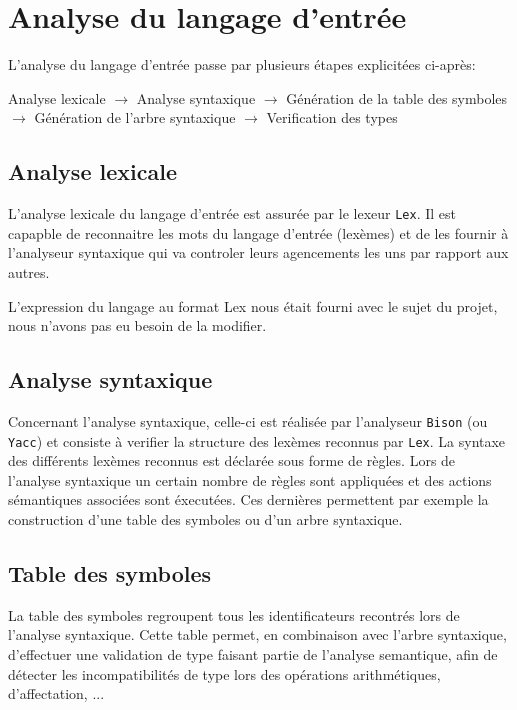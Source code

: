 \newpage
\section{Analyse du langage d'entrée}

L'analyse du langage d'entrée passe par plusieurs étapes explicitées ci-après:

Analyse lexicale $\rightarrow$ Analyse syntaxique $\rightarrow$ Génération de la table des symboles $\rightarrow$ Génération de l'arbre syntaxique $\rightarrow$ Verification des types

\subsection{Analyse lexicale}

L'analyse lexicale du langage d'entrée est assurée par le lexeur \verb?Lex?. Il est capapble de reconnaitre les mots du langage d'entrée (lexèmes) et de les fournir à l'analyseur syntaxique qui va controler leurs agencements les uns par rapport aux autres.

L'expression du langage au format Lex nous était fourni avec le sujet du projet, nous n'avons pas eu besoin de la modifier.


\subsection{Analyse syntaxique}

Concernant l'analyse syntaxique, celle-ci est réalisée par l'analyseur \verb?Bison? (ou \verb?Yacc?) et consiste à verifier la structure des lexèmes reconnus par \verb?Lex?.
La syntaxe des différents lexèmes reconnus est déclarée sous forme de règles. Lors de l'analyse syntaxique un certain nombre de règles sont appliquées et des actions sémantiques associées sont éxecutées. Ces dernières permettent par exemple la construction d'une table des symboles ou d'un arbre syntaxique.

\subsection{Table des symboles}

La table des symboles regroupent tous les identificateurs recontrés lors de l'analyse syntaxique. 
Cette table permet, en combinaison avec l'arbre syntaxique, d'effectuer une validation de type faisant partie de l'analyse semantique, afin de détecter les incompatibilités de type lors des opérations arithmétiques, d'affectation, ...\\ 


